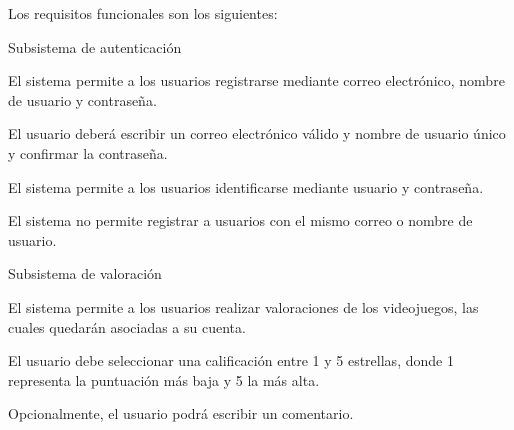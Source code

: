 Los requisitos funcionales son los siguientes: 

\begin{functional}
    \item Subsistema de autenticación
    \begin{functional}
        \item El sistema permite a los usuarios registrarse mediante correo electrónico, nombre de usuario y contraseña.
        \begin{functional}
            \item El usuario deberá escribir un correo electrónico válido y nombre de usuario único y confirmar la contraseña.
        \end{functional}
        \item El sistema permite a los usuarios identificarse mediante usuario y contraseña.
        \item El sistema no permite registrar a usuarios con el mismo correo o nombre de usuario.
    \end{functional}

    \item Subsistema de valoración
    \begin{functional}
        \item El sistema permite a los usuarios realizar valoraciones de los videojuegos, las cuales quedarán asociadas a su cuenta.
        \begin{functional}
            \item El usuario debe seleccionar una calificación entre 1 y 5 estrellas, donde 1 representa la puntuación más baja y 5 la más alta.
            \item Opcionalmente, el usuario podrá escribir un comentario.
        \end{functional} 
    \end{functional}


\end{functional}
